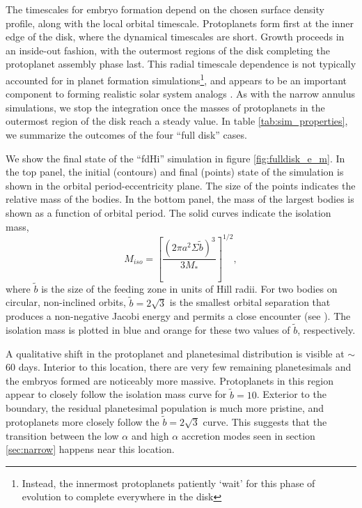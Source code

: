 \documentclass[twocolumn]{aastex63}
\begin{document}
The timescales for embryo formation depend on
the chosen surface density profile, along with the local orbital
timescale. Protoplanets form first at the inner edge of the disk,
where the dynamical timescales are short. Growth proceeds in an
inside-out fashion, with the outermost regions of the disk completing
the protoplanet assembly phase last. This radial timescale dependence is not typically
accounted for in planet formation simulations\footnote{Instead, the innermost protoplanets 
patiently `wait' for this phase of evolution to complete everywhere in the disk}, and appears to be an
important component to forming realistic solar system analogs
\citep{clement20}. As with the narrow annulus simulations, we stop the
integration once the masses of protoplanets in the outermost region of
the disk reach a steady value. In table \ref{tab:sim_properties}, we
summarize the outcomes of the four ``full disk'' cases.

We show the final state of the ``fdHi'' simulation in figure \ref{fig:fulldisk_e_m}. In the top panel,
the initial (contours) and final (points) state of the simulation is shown in the orbital period-eccentricity plane. The size of the points indicates the relative mass of the bodies. In the bottom panel, the mass of the largest bodies is shown as a function of orbital period. The solid curves indicate the isolation mass,
\begin{equation}\label{eq:iso}
	M_{iso} = \left[ \frac{\left( 2 \pi a^2 \Sigma \tilde{b} \right)^3}{3 M_{*}} \right]^{1/2},
\end{equation}
where $\tilde{b}$ is the size of the feeding zone in units
of Hill radii. For two bodies on circular, non-inclined orbits,  $\tilde{b} = 2
\sqrt{3}$ is the smallest orbital separation that produces a non-negative Jacobi energy
and permits a close encounter (see \citet{naka88}).
The isolation mass is plotted in blue and orange for these two values of $\tilde{b}$, respectively.

A qualitative shift in the protoplanet and planetesimal distribution is visible at $\sim$ 60 days. Interior to this location, there are very few remaining planetesimals and the embryos formed are noticeably more massive. Protoplanets in this region appear to closely follow the isolation mass curve for $\tilde{b} = 10$. Exterior to the boundary, the residual planetesimal population is much more pristine, and protoplanets more closely follow the $\tilde{b} = 2 \sqrt{3}$ curve. This suggests that the transition between the low $\alpha$ and high $\alpha$ accretion modes seen in section \ref{sec:narrow} happens near this location.
\end{document}
